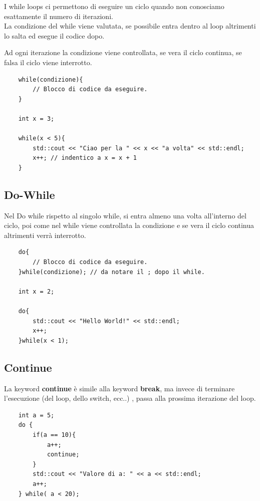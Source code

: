 \textsf{\small I while loops ci permettono di eseguire un ciclo quando non conosciamo esattamente il numero di iterazioni. } \\

\textsf{\small La condizione del while viene valutata, se possibile entra dentro al loop altrimenti lo salta ed esegue il codice dopo.}

\textsf{\small Ad ogni iterazione la condizione viene controllata, se vera il ciclo continua, se falsa il ciclo viene interrotto.} \\

\begin{lstlisting}
	while(condizione){
		// Blocco di codice da eseguire.
	}

	int x = 3;
	
	while(x < 5){
		std::cout << "Ciao per la " << x << "a volta" << std::endl;
		x++; // indentico a x = x + 1
	}
\end{lstlisting}

\subsection{Do-While}

\textsf{\small Nel Do while rispetto al singolo while, si entra almeno una volta all'interno del ciclo, poi come nel while viene controllata la condizione e se vera il ciclo continua altrimenti verrà interrotto.} \\

\begin{lstlisting}
	do{
		// Blocco di codice da eseguire.
	}while(condizione); // da notare il ; dopo il while.

	int x = 2;
	
	do{
		std::cout << "Hello World!" << std::endl;
		x++;
	}while(x < 1);
\end{lstlisting}

\subsection{Continue}

\textsf{\small La keyword \textbf{continue} è simile alla keyword \textbf{break}, ma invece di terminare l'esecuzione (del loop, dello switch, ecc..) , passa alla prossima iterazione del loop.}\\

\begin{lstlisting}
	int a = 5;
	do {
		if(a == 10){
			a++;
			continue;
		}
		std::cout << "Valore di a: " << a << std::endl;
		a++;
	} while( a < 20);
\end{lstlisting}

